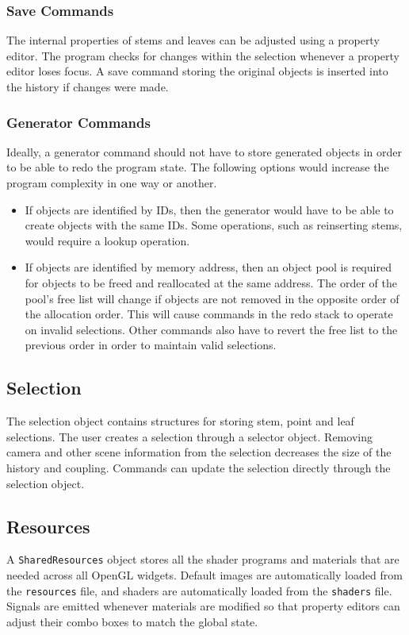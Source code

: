 \documentclass[10pt]{article}
\begin{document}
\subsubsection{Save Commands}
The internal properties of stems and leaves can be adjusted using a property editor. The program checks for changes within the selection whenever a property editor loses focus. A save command storing the original objects is inserted into the history if changes were made.

\subsubsection{Generator Commands}
Ideally, a generator command should not have to store generated objects in order to be able to redo the program state. The following options would increase the program complexity in one way or another.

\begin{itemize}
\item If objects are identified by IDs, then the generator would have to be able to create objects with the same IDs. Some operations, such as reinserting stems, would require a lookup operation.
\item If objects are identified by memory address, then an object pool is required for objects to be freed and reallocated at the same address. The order of the pool's free list will change if objects are not removed in the opposite order of the allocation order. This will cause commands in the redo stack to operate on invalid selections. Other commands also have to revert the free list to the previous order in order to maintain valid selections.
\end{itemize}

\subsection{Selection}
The selection object contains structures for storing stem, point and leaf selections. The user creates a selection through a selector object. Removing camera and other scene information from the selection decreases the size of the history and coupling. Commands can update the selection directly through the selection object.

\subsection{Resources}
A \texttt{SharedResources} object stores all the shader programs and materials that are needed across all OpenGL widgets. Default images are automatically loaded from the \texttt{resources} file, and shaders are automatically loaded from the \texttt{shaders} file. Signals are emitted whenever materials are modified so that property editors can adjust their combo boxes to match the global state.
\end{document}
